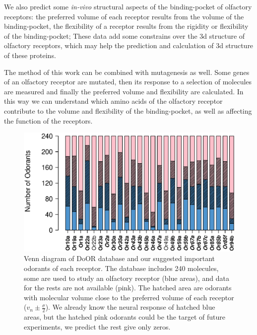 \documentclass[11pt]{article} %
\begin{document}

We also predict some {\it in-vivo} structural aspects of  the binding-pocket of olfactory receptors:
the preferred volume of each receptor results from the volume of the binding-pocket,
the flexibility of a receptor results from the rigidity or flexibility of the binding-pocket; 
These data add some constrains over the 3d structure of olfactory receptors, 
which may help the prediction and calculation of 3d structure of these proteins. 

The method of this work can be combined with mutagenesis as well. 
Some genes of an olfactory receptor are mutated, 
then its response to a selection of molecules are measured and finally the preferred volume and flexibility are calculated.
In this way we can understand which amino acids of the olfactory receptor contribute to the volume and flexibility of the binding-pocket, 
as well as affecting the function of the receptors.


\begin{figure}
\centering
	\includegraphics[width=\textwidth]{fig/odorant-suggest}
	\caption{Venn diagram of DoOR database and our suggested important odorants of each receptor.
			The database includes 240 molecules, 
			some are used to study an olfactory receptor (blue areas), 
			and data for the rests are not available (pink).
			The hatched area are odorants with molecular volume close to the preferred volume of each receptor
			($v_n \pm \frac{\sigma}{2}$).
			We already know the neural response of hatched blue areas, 
			but the hatched pink odorants could be the target of future experiments, we predict the rest give only zeros.
			}
	\label{fig:odorant-suggest}
\end{figure}
\end{document}
